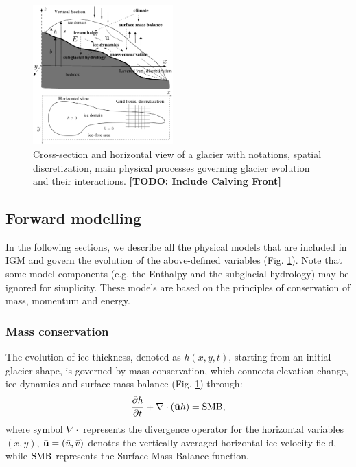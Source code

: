 \documentclass[10pt,twocolumn]{article}
\begin{document}
\begin{figure}[!h]
\begin{center} 
\includegraphics[width=0.48\textwidth]{fig/scheme.pdf}   
\end{center}
\caption{Cross-section and horizontal view of a glacier with notations, spatial discretization, 
main physical processes governing glacier evolution and their interactions. 
\textbf{[TODO: Include Calving Front]}
\label{notations}}
\end{figure}

\subsection{Forward modelling}

In the following sections, we describe all the physical models that are included in 
IGM and govern the evolution of the above-defined variables (Fig. \ref{notations}). 
Note that some model components (e.g. the Enthalpy and the subglacial hydrology)
may be ignored for simplicity.
These models are based on the principles of conservation of mass, momentum and energy.

\subsubsection{Mass conservation}
\label{phys_mass_conservation}

The evolution of ice thickness, denoted as $h(x, y, t)$, starting from an initial 
glacier shape, is governed by mass conservation, which connects elevation change,
ice dynamics and surface mass balance (Fig. \ref{notations}) through:
\begin{equation}
\frac{\partial h}{\partial t} + \nabla \cdot \left( \bar{\bf u} h \right) = {\rm SMB},
\label{conservationeq}
\end{equation}
where symbol $\nabla \cdot$ represents the divergence operator 
for the horizontal variables $(x, y)$, $\bar{\bf u} = (\bar{u}, \bar{v})$ denotes 
the vertically-averaged horizontal ice velocity field, while ${\rm SMB}$ represents 
the Surface Mass Balance function.
\end{document}
